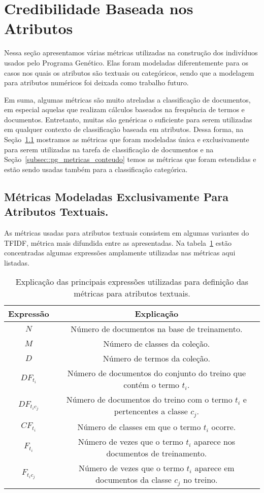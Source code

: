 
\section{Credibilidade Baseada nos Atributos}
\label{sec::pg_cred_baseada_conteudo}

Nessa seção apresentamos várias métricas utilizadas na construção dos indivíduos usados pelo Programa Genético. Elas foram modeladas diferentemente para os casos nos quais os atributos são textuais ou categóricos, sendo que a modelagem para atributos numéricos foi deixada como trabalho futuro. 

Em suma, algumas métricas são muito atreladas a classificação de documentos, em especial aquelas que realizam cálculos baseados na frequência de termos e documentos. 
Entretanto, muitas são genéricas o suficiente para serem utilizadas em qualquer contexto de classificação baseada em atributos.
Dessa forma, na Seção~\ref{subsec::pg_metricas_conteudo_textual} mostramos as métricas que foram modeladas única e exclusivamente para serem utilizadas na tarefa de classificação de documentos  e na Seção~\ref{subsec::pg_metricas_conteudo} temos as métricas que foram estendidas e estão sendo usadas também para a classificação categórica.

\subsection{Métricas Modeladas Exclusivamente Para Atributos Textuais.}
\label{subsec::pg_metricas_conteudo_textual}

As métricas usadas para atributos textuais consistem em algumas variantes do \textsc{TFIDF}, métrica mais difundida entre as apresentadas. Na tabela~\ref{table::metricas_textuais} estão concentradas algumas expressões amplamente utilizadas nas métricas aqui listadas.

\begin{table}[ht*]
\centering
\begin{tabular}{|c|c|}
\toprule
    \textbf{Expressão} & \textbf{Explicação} \\
\midrule
    $N$           & Número de documentos na base de treinamento. \tabularnewline \hline
    $M$           & Número de classes da coleção. \tabularnewline \hline
    $D$           & Número de termos da coleção. \tabularnewline \hline
    $DF_{t_i} $   & Número de documentos do conjunto do treino que contém o termo $t_i$. \tabularnewline \hline
    $DF_{t_ic_j}$ & Número de documentos do treino com o termo $t_i$ e pertencentes a classe $c_j$. \tabularnewline \hline
    $CF_{t_i}$    & Número de classes em que o termo $t_i$ ocorre. \tabularnewline \hline 
    $F_{t_i}$     & Número de vezes que o termo $t_i$ aparece nos documentos de treinamento. \tabularnewline \hline
    $F_{t_ic_j}$  & Número de vezes que o termo $t_i$ aparece em documentos da classe $c_j$ no treino. \tabularnewline 
\bottomrule
\end{tabular}
\caption{Explicação das principais expressões utilizadas para definição das métricas para atributos textuais.}
\label{table::metricas_textuais}
\end{table}

